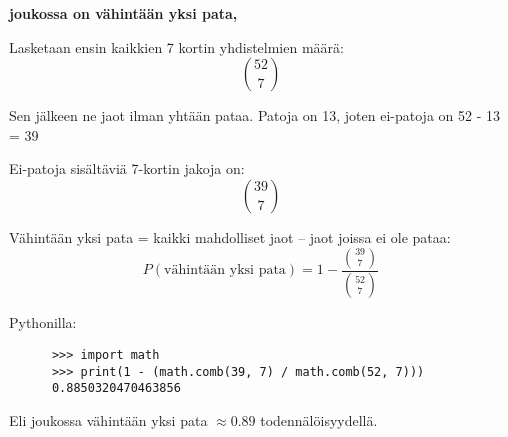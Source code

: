 \documentclass[12pt,a4paper]{article}
\begin{document}
\begin{kohta}
  \item \textbf{joukossa on vähintään yksi pata,}

  Lasketaan ensin kaikkien 7 kortin yhdistelmien määrä:
  \[
  \binom{52}{7}
  \]

  Sen jälkeen ne jaot ilman yhtään pataa.
  Patoja on 13, joten ei-patoja on 52 - 13 = 39

  Ei-patoja sisältäviä 7-kortin jakoja on:
  \[
  \binom{39}{7}
  \]

  Vähintään yksi pata = kaikki mahdolliset jaot – jaot joissa ei ole pataa:
  \[
  P(\text{vähintään yksi pata}) = 1 - \frac{\binom{39}{7}}{\binom{52}{7}}
  \]

  Pythonilla:
    \begin{verbatim}
      >>> import math
      >>> print(1 - (math.comb(39, 7) / math.comb(52, 7)))
      0.8850320470463856
    \end{verbatim}

    Eli joukossa vähintään yksi pata $\approx 0.89$ todennälöisyydellä.

\begin{comment}
  
\begin{alakohta}
    \item \textbf{Tapahtuma ja sen komplementti:} \\
    A: Kädessä on vähintään yksi pata \\
    Komplementti $A^c$: Käsi missä ei ole yhtään pataa

    \item \textbf{Lasketaan komplementti tapaukset:} \\
    Pakassa on 13 pataa ja $52 - 13 = 39$ muuta korttia. Jotta kädessä ei ole
    yhtään pataa, kaikki 7 korttia on valitaan näistä 39 kortista.
    \[
    \text{Kädet ilman pataa} = \binom{39}{7} = 15380937
    \]

    \item \textbf{Lasketaan todennäköisyys:} \\
    Komplementti tapauksen todennäköisyys on:
    \[
    P(A^c) = \frac{\binom{39}{7}}{\binom{52}{7}}
    \]
    Alkuperäisen tapauksen todennäköisyys on $P(A) = 1 - P(A^c)$.
    \[
    P(\text{vähintään yksi pata}) = 1 - \frac{\binom{39}{7}}{\binom{52}{7}} \approx 1 - 0.114968 = 0.885032
    \]
\end{alakohta}

\textbf{Vastaus (a):} Todennäköisyys on $1 - \frac{\binom{39}{7}}{\binom{52}{7}} \approx 88.5\%$.


\end{comment}
\end{kohta}
\end{document}
